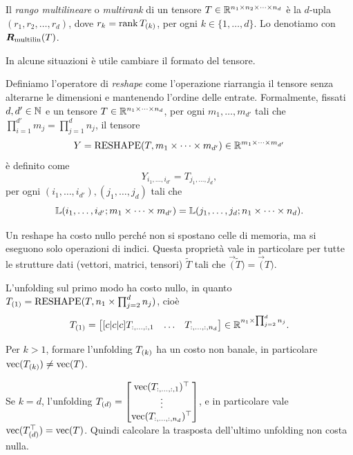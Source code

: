\begin{definition}
	Il \emph{rango multilineare} o \emph{multirank} di un tensore $ T \in \Rmsiz $ è la $ d $-upla $
		(r_1, r_2, \ldots, r_d) $, dove $ r_k = \rank{\Tm{T}{k}} $, per ogni $ k \in \{1, \ldots, d\}
	$. Lo denotiamo con $ \bm{R}_{\text{multilin}}(T) $.
\end{definition}


In alcune situazioni è utile cambiare il formato del tensore.

\begin{definition}[Reshape]
	Definiamo l'operatore di \emph{reshape} come l'operazione riarrangia il tensore senza alterarne le dimensioni e mantenendo l'ordine delle entrate. Formalmente,
	fissati $ d, d' \in \mathbb{N}$ e un tensore $ T \in \Rmsiz! $, per ogni $ m_1, \ldots, m_{d'} $ tali
	che $ \prod_{i=1}^{d'} m_j = \prod_{j = 1}^{d} n_j$, il tensore
	\begin{equation*}
		Y = \reshape(T, \msiz![m][d']) \in \Rmsiz![m][d']
	\end{equation*}
	è definito come
	\[
		Y_{i_1, \ldots, i_{d'}}= T_{j_1, \ldots, j_d}
		,\]
	per ogni $(i_1, \ldots, i_{d'}),(j_1, \ldots,
		j_d) $ tali che
	\begin{equation*}
		\L(i_1, \ldots, i_{d'}; \msiz![m][d']) = \L(j_1, \ldots,
		j_d; \msiz!).
	\end{equation*}
\end{definition}
\begin{remark}
	Un reshape ha costo nullo perché non si spostano celle di memoria, ma si eseguono solo operazioni
	di indici. Questa proprietà vale in particolare per tutte le strutture dati (vettori, matrici,
	tensori) $ \tilde{T} $ tali che $ \vec(\tilde{T}) = \vec(T) $.
\end{remark}
\begin{remark}
	L'unfolding sul primo modo ha costo nullo, in quanto $ \Tm{T}{1} = \reshape(T, n_1 \times
		\prod_{j=2}^d n_{j}) $, cioè
	\begin{equation*}
		\Tm{T}{1} = \begin{bmatrix}[c|c|c]
			T_{:, \ldots, :,1} & \dots & T_{:, \ldots, :, n_{d}}
		\end{bmatrix} \in \R^{n_1 \times
			\prod_{j=2}^d n_{j}}.
	\end{equation*}
\end{remark}
\begin{remark}
	Per $ k>1 $, formare l'unfolding $ \Tm{T}{k} $ ha un costo non banale, in particolare $
		\vec(\Tm{T}{k}) \neq \vec(T) $.

	Se $ k=d $, l'unfolding $ \Tm{T}{d} = \begin{bmatrix} \vec(T_{:, \ldots, :, 1})^{\top} \\  \vdots
			\\ \vec(T_{:, \ldots, :, n_{d}})^{\top}\end{bmatrix}  $, e in particolare vale $
		\vec(\Tm{T}{d}^{\top}) = \vec(T)$. Quindi calcolare la trasposta dell'ultimo unfolding
	non costa nulla.
\end{remark}

